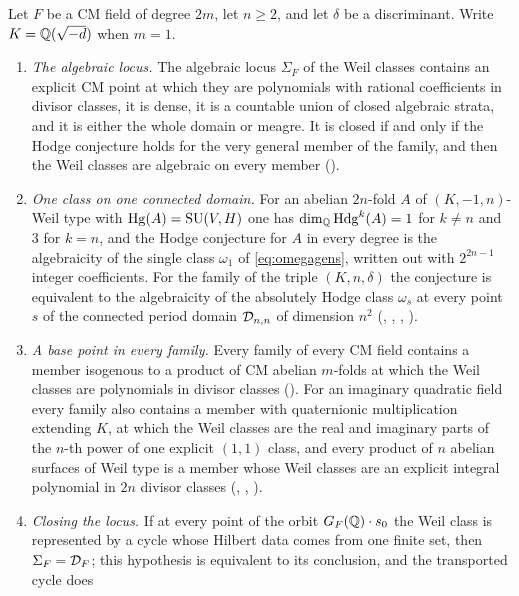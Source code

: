 \begin{theorem}[Closure]\label{thm:final}
Let $F$ be a CM field of degree $2m$, let $n\ge2$, and let $\delta$ be a
discriminant. Write $K=\mathbb{Q}(\sqrt{-d})$ when $m=1$.
\begin{enumerate}[label=\textup{(\roman*)},leftmargin=2.8em,itemsep=4pt]
\item \emph{The algebraic locus.} The algebraic locus $\Sigma_{F}$ of the Weil
  classes contains an explicit CM point at which they are polynomials with
  rational coefficients in divisor classes, it is dense, it is a countable
  union of closed algebraic strata, and it is either the whole domain or
  meagre. It is closed if and only if the Hodge conjecture holds for the very
  general member of the family, and then the Weil classes are algebraic on
  every member ().
\item \emph{One class on one connected domain.} For an abelian $2n$-fold $A$ of
  $(K,-1,n)$-Weil type with $\operatorname{Hg}(A)=\operatorname{SU}(V,H)$ one has
  $\dim_{\mathbb{Q}}\mathrm{Hdg}^{k}(A)=1$ for $k\ne n$ and $3$ for $k=n$, and the Hodge
  conjecture for $A$ in every degree is the algebraicity of the single class
  $\omega_{1}$ of \eqref{eq:omegagens}, written out with $2^{2n-1}$ integer
  coefficients. For the family of the triple $(K,n,\delta)$ the conjecture is
  equivalent to the algebraicity of the absolutely Hodge class $\omega_{s}$ at
  every point $s$ of the connected period domain $\mathcal{D}_{n,n}$ of dimension
  $n^{2}$ (, , ,
  ).
\item \emph{A base point in every family.} Every family of every CM field
  contains a member isogenous to a product of CM abelian $m$-folds at which
  the Weil classes are polynomials in divisor classes
  (). For an imaginary quadratic field every family also
  contains a member with quaternionic multiplication extending $K$, at which
  the Weil classes are the real and imaginary parts of the $n$-th power of one
  explicit $(1,1)$ class, and every product of $n$ abelian surfaces of Weil
  type is a member whose Weil classes are an explicit integral polynomial in
  $2n$ divisor classes (, ,
  ).
\item \emph{Closing the locus.} If at every point of the orbit
  $G_{F}(\mathbb{Q})\cdot s_{0}$ the Weil class is represented by a cycle whose
  Hilbert data comes from one finite set, then $\Sigma_{F}=\mathcal{D}_{F}$; this
  hypothesis is equivalent to its conclusion, and the transported cycle does

\end{enumerate}
\end{theorem}
